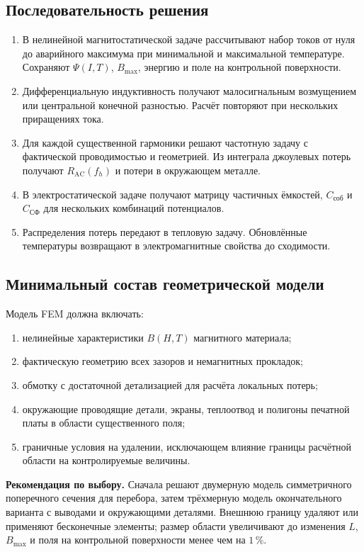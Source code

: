 \documentclass[14pt,a4paper]{extarticle}
\newcommand{\recommend}{\par\noindent\textbf{Рекомендация по выбору.} }
\begin{document}
\subsection{Последовательность решения}
\label{subsec:fem-sequence}

\begin{enumerate}
\item В нелинейной магнитостатической задаче рассчитывают набор токов от
нуля до аварийного максимума при минимальной и максимальной температуре.
Сохраняют $\Psi(I,T)$, $B_{\max}$, энергию и поле на контрольной поверхности.
\item Дифференциальную индуктивность получают малосигнальным возмущением или
центральной конечной разностью. Расчёт повторяют при нескольких приращениях
тока.
\item Для каждой существенной гармоники решают частотную задачу с
фактической проводимостью и геометрией. Из интеграла джоулевых потерь получают
$R_{\text{AC}}(f_h)$ и потери в окружающем металле.
\item В электростатической задаче получают матрицу частичных ёмкостей,
$C_{\text{соб}}$ и $C_{\text{СФ}}$ для нескольких комбинаций потенциалов.
\item Распределения потерь передают в тепловую задачу. Обновлённые
температуры возвращают в электромагнитные свойства до сходимости.
\end{enumerate}

\subsection{Минимальный состав геометрической модели}

Модель FEM должна включать:
\begin{enumerate}
 \item нелинейные характеристики $B(H,T)$ магнитного материала;
 \item фактическую геометрию всех зазоров и немагнитных прокладок;
 \item обмотку с достаточной детализацией для расчёта локальных потерь;
 \item окружающие проводящие детали, экраны, теплоотвод и полигоны
 печатной платы в области существенного поля;
 \item граничные условия на удалении, исключающем влияние границы
 расчётной области на контролируемые величины.
\end{enumerate}

\recommend Сначала решают двумерную модель симметричного поперечного
сечения для перебора, затем трёхмерную модель окончательного варианта с
выводами и окружающими деталями. Внешнюю границу удаляют или применяют
бесконечные элементы; размер области увеличивают до изменения $L$,
$B_{\max}$ и поля на контрольной поверхности менее чем на
$1\,\%$.
\end{document}
